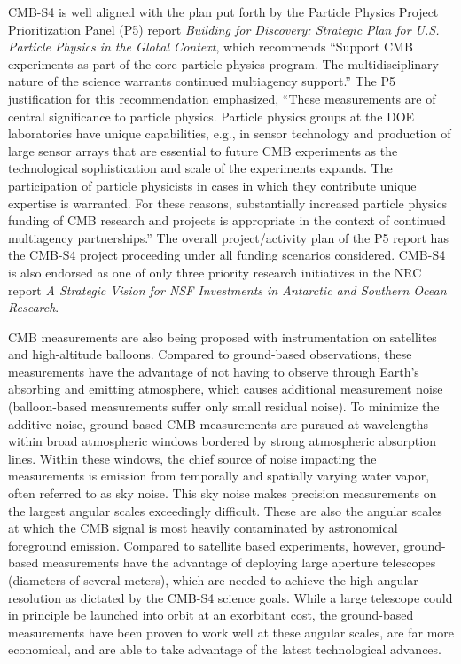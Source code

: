 CMB-S4 is well aligned with the plan put forth by the Particle Physics Project Prioritization Panel (P5) report {\it Building for Discovery: Strategic Plan for U.S. Particle Physics in the Global Context}, which recommends ``Support CMB experiments as part of the core particle physics program. The multidisciplinary nature of the science warrants continued multiagency support.''  The P5 justification for this recommendation emphasized, ``These measurements are of central significance to particle physics. Particle physics groups at the DOE laboratories have unique capabilities, e.g., in sensor technology and production of large sensor arrays that are essential to future CMB experiments as the technological sophistication and scale of the experiments expands. The participation of particle physicists in cases in which they contribute unique expertise is warranted. For these reasons, substantially increased particle physics funding of CMB research and projects is appropriate in the context of continued multiagency partnerships.''  The overall project/activity plan of the P5 report has the CMB-S4 project proceeding under all funding scenarios considered.  CMB-S4 is also endorsed as one of only three priority research initiatives in 
the NRC report {\it A Strategic Vision for NSF Investments in Antarctic and Southern Ocean Research}. 

CMB measurements are also being proposed with instrumentation on satellites and high-altitude balloons. Compared to ground-based observations, these measurements have the advantage of not having to observe through Earth's absorbing and emitting atmosphere, which causes additional measurement noise (balloon-based measurements suffer only small residual noise).
To minimize the additive noise, ground-based CMB measurements are pursued at wavelengths within broad atmospheric windows bordered by strong atmospheric absorption lines. Within these windows, the chief source of noise impacting the measurements is emission from temporally and spatially varying water vapor, often referred to as sky noise. This sky noise makes precision measurements on the largest angular scales exceedingly difficult. These are also the angular scales at which the CMB signal is most heavily contaminated by astronomical foreground emission.
Compared to satellite based experiments, however, ground-based measurements have the advantage of deploying large aperture telescopes (diameters of several meters), which are needed to achieve the high angular resolution as dictated by the CMB-S4 science goals. While a large telescope could in principle be launched into orbit at an exorbitant cost, the ground-based measurements have been proven to work well at these angular scales,  are far more economical, and are able to take advantage of the latest technological advances. 

